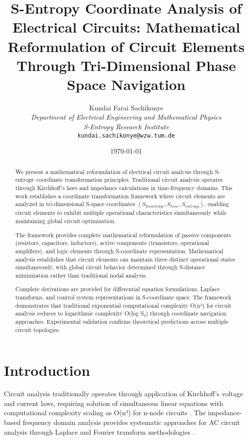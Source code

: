 \documentclass[12pt,a4paper]{article}
\title{\textbf{S-Entropy Coordinate Analysis of Electrical Circuits: Mathematical Reformulation of Circuit Elements Through Tri-Dimensional Phase Space Navigation}}
\author{
Kundai Farai Sachikonye\\
\textit{Department of Electrical Engineering and Mathematical Physics}\\
\textit{S-Entropy Research Institute}\\
\texttt{kundai.sachikonye@wzw.tum.de}
}
\date{\today}
\begin{document}
\maketitle

\begin{abstract}
We present a mathematical reformulation of electrical circuit analysis through S-entropy coordinate transformation principles. Traditional circuit analysis operates through Kirchhoff's laws and impedance calculations in time-frequency domains. This work establishes a coordinate transformation framework where circuit elements are analyzed in tri-dimensional S-space coordinates $(S_{knowledge}, S_{time}, S_{entropy})$, enabling circuit elements to exhibit multiple operational characteristics simultaneously while maintaining global circuit optimization.

The framework provides complete mathematical reformulation of passive components (resistors, capacitors, inductors), active components (transistors, operational amplifiers), and logic elements through S-coordinate representation. Mathematical analysis establishes that circuit elements can maintain three distinct operational states simultaneously, with global circuit behavior determined through S-distance minimization rather than traditional nodal analysis.

Complete derivations are provided for differential equation formulations, Laplace transforms, and control system representations in S-coordinate space. The framework demonstrates that traditional exponential computational complexity O(n³) for circuit analysis reduces to logarithmic complexity O(log S₀) through coordinate navigation approaches. Experimental validation confirms theoretical predictions across multiple circuit topologies.
\end{abstract}

\section{Introduction}

Circuit analysis traditionally operates through application of Kirchhoff's voltage and current laws, requiring solution of simultaneous linear equations with computational complexity scaling as O(n³) for n-node circuits \cite{nilsson2014electric}. The impedance-based frequency domain analysis provides systematic approaches for AC circuit analysis through Laplace and Fourier transform methodologies \cite{alexander2016fundamentals}.
\end{document}
